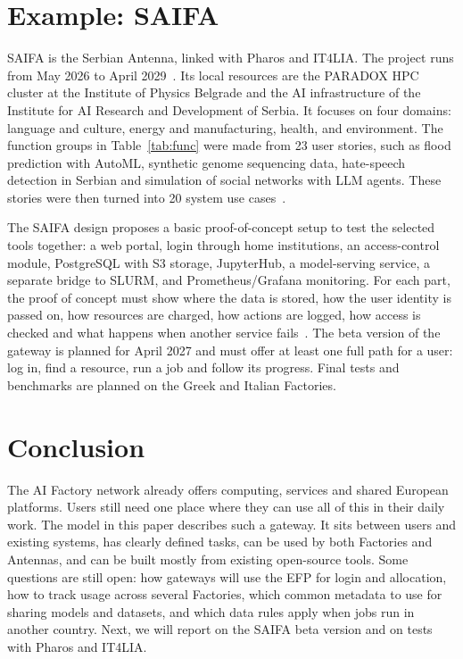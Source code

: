 \documentclass[conference,a4paper]{IEEEtran}
\begin{document}
\section{Example: SAIFA}
\label{sec:saifa}

SAIFA is the Serbian Antenna, linked with Pharos and IT4LIA. The project runs from May 2026 to April 2029~\cite{cordis_saifa}. Its local resources are the PARADOX HPC cluster at the Institute of Physics Belgrade and the AI infrastructure of the Institute for AI Research and Development of Serbia. It focuses on four domains: language and culture, energy and manufacturing, health, and environment. The function groups in Table~\ref{tab:func} were made from 23 user stories, such as flood prediction with AutoML, synthetic genome sequencing data, hate-speech detection in Serbian and simulation of social networks with LLM agents. These stories were then turned into 20 system use cases~\cite{saifa_d31}.

The SAIFA design proposes a basic proof-of-concept setup to test the selected tools together: a web portal, login through home institutions, an access-control module, PostgreSQL with S3 storage, JupyterHub, a model-serving service, a separate bridge to SLURM, and Prometheus/Grafana monitoring. For each part, the proof of concept must show where the data is stored, how the user identity is passed on, how resources are charged, how actions are logged, how access is checked and what happens when another service fails~\cite{saifa_d31}. The beta version of the gateway is planned for April 2027 and must offer at least one full path for a user: log in, find a resource, run a job and follow its progress. Final tests and benchmarks are planned on the Greek and Italian Factories.

\section{Conclusion}

The AI Factory network already offers computing, services and shared European platforms. Users still need one place where they can use all of this in their daily work. The model in this paper describes such a gateway. It sits between users and existing systems, has clearly defined tasks, can be used by both Factories and Antennas, and can be built mostly from existing open-source tools. Some questions are still open: how gateways will use the EFP for login and allocation, how to track usage across several Factories, which common metadata to use for sharing models and datasets, and which data rules apply when jobs run in another country. Next, we will report on the SAIFA beta version and on tests with Pharos and IT4LIA.



\end{document}
